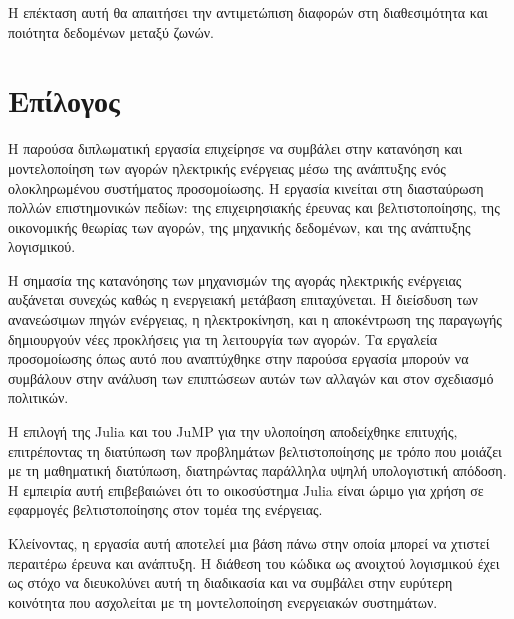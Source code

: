 Η επέκταση αυτή θα απαιτήσει την αντιμετώπιση διαφορών στη διαθεσιμότητα και ποιότητα δεδομένων μεταξύ ζωνών.


\section{Επίλογος}
\label{sec:epilogue}

Η παρούσα διπλωματική εργασία επιχείρησε να συμβάλει στην κατανόηση και μοντελοποίηση των αγορών ηλεκτρικής ενέργειας μέσω της ανάπτυξης ενός ολοκληρωμένου συστήματος προσομοίωσης. Η εργασία κινείται στη διασταύρωση πολλών επιστημονικών πεδίων: της επιχειρησιακής έρευνας και βελτιστοποίησης, της οικονομικής θεωρίας των αγορών, της μηχανικής δεδομένων, και της ανάπτυξης λογισμικού.

Η σημασία της κατανόησης των μηχανισμών της αγοράς ηλεκτρικής ενέργειας αυξάνεται συνεχώς καθώς η ενεργειακή μετάβαση επιταχύνεται. Η διείσδυση των ανανεώσιμων πηγών ενέργειας, η ηλεκτροκίνηση, και η αποκέντρωση της παραγωγής δημιουργούν νέες προκλήσεις για τη λειτουργία των αγορών. Τα εργαλεία προσομοίωσης όπως αυτό που αναπτύχθηκε στην παρούσα εργασία μπορούν να συμβάλουν στην ανάλυση των επιπτώσεων αυτών των αλλαγών και στον σχεδιασμό πολιτικών.

Η επιλογή της Julia και του JuMP για την υλοποίηση αποδείχθηκε επιτυχής, επιτρέποντας τη διατύπωση των προβλημάτων βελτιστοποίησης με τρόπο που μοιάζει με τη μαθηματική διατύπωση, διατηρώντας παράλληλα υψηλή υπολογιστική απόδοση. Η εμπειρία αυτή επιβεβαιώνει ότι το οικοσύστημα Julia είναι ώριμο για χρήση σε εφαρμογές βελτιστοποίησης στον τομέα της ενέργειας.

Κλείνοντας, η εργασία αυτή αποτελεί μια βάση πάνω στην οποία μπορεί να χτιστεί περαιτέρω έρευνα και ανάπτυξη. Η διάθεση του κώδικα ως ανοιχτού λογισμικού έχει ως στόχο να διευκολύνει αυτή τη διαδικασία και να συμβάλει στην ευρύτερη κοινότητα που ασχολείται με τη μοντελοποίηση ενεργειακών συστημάτων.
